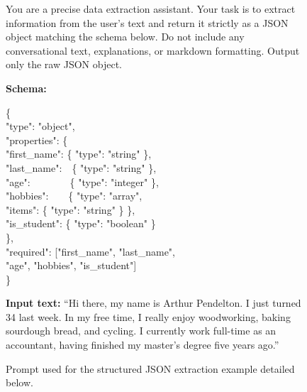 \documentclass[11pt, a4paper, logo, copyright, gdm]{google}
\begin{document}
\begin{figure}[H]
\begin{tcolorbox}[
  colback=gray!5,
  colframe=gray!50,
  fontupper=\small\ttfamily,
  title={\normalfont\sffamily\bfseries Prompt}
]
You are a precise data extraction assistant. Your task is to extract
information from the user's text and return it strictly as a JSON
object matching the schema below. Do not include any conversational
text, explanations, or markdown formatting. Output only the raw JSON
object.

\medskip
\normalfont\small\textbf{Schema:}

{\ttfamily\small
\setlength{\parindent}{1em}

\{\\
\hspace*{1em}"type": "object",\\
\hspace*{1em}"properties": \{\\
\hspace*{2em}"first\_name": \{ "type": "string" \},\\
\hspace*{2em}"last\_name":~~\{ "type": "string" \},\\
\hspace*{2em}"age":~~~~~~~~\{ "type": "integer" \},\\
\hspace*{2em}"hobbies":~~~~\{ "type": "array",\\
\hspace*{5.5em}"items": \{ "type": "string" \} \},\\
\hspace*{2em}"is\_student": \{ "type": "boolean" \}\\
\hspace*{1em}\},\\
\hspace*{1em}"required": ["first\_name", "last\_name",\\
\hspace*{5.5em}"age", "hobbies", "is\_student"]\\
\}
}

\medskip
\normalfont\small\textbf{Input text:} ``Hi there, my name is Arthur Pendelton. I just
turned 34 last week. In my free time, I really enjoy woodworking,
baking sourdough bread, and cycling. I currently work full-time as an
accountant, having finished my master's degree five years ago.''
\end{tcolorbox}
\caption{Prompt used for the structured JSON extraction example detailed below.}
\label{fig:json-prompt}


\end{figure}
\end{document}
